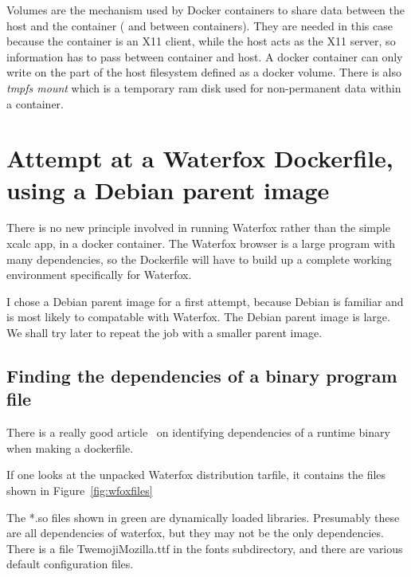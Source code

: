 \documentclass[a4paper]{article}  %
\begin{document}
Volumes are the mechanism used by Docker containers to share data between the host and the container ( and between containers). They are needed in this case because the container is an X11 client, while the host acts as the X11 server, so information has to pass between container and host.  A docker container can only write on the part of the host filesystem defined as a docker volume. There is also {\em tmpfs mount} which is a temporary ram disk used for non-permanent data within a container.

\section{Attempt at a Waterfox Dockerfile, using a  Debian parent image}
There is no new principle involved in running Waterfox rather than the simple xcalc app, in a docker container. The Waterfox browser is a large program with many dependencies, so the Dockerfile will have to build up a complete working environment specifically for Waterfox. 

I chose a Debian parent image for a first attempt, because Debian is familiar and is most likely to compatable with Waterfox.  The Debian parent image is large. We shall try later to repeat the job with a smaller parent image. 

\subsection{Finding the dependencies of a binary program file}
There is a really good article~\cite{rehn:21} on identifying dependencies of a runtime binary when making a dockerfile.

If one looks at the unpacked Waterfox distribution tarfile, it contains the files shown in Figure~\ref{fig:wfoxfiles}

The *.so files shown in green are dynamically loaded libraries. Presumably these are all dependencies of waterfox, but they may not be the only dependencies. There is a file TwemojiMozilla.ttf in the fonts subdirectory, and there are various default configuration files.
\end{document}
